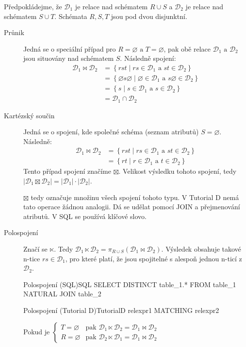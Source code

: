 Předpokládejme, že $\mathcal{D}_{1}$ je relace nad schématem $R \cup S$ a $\mathcal{D}_{2}$ je relace nad schématem $S \cup T$. Schémata $R, S, T$ jsou pod dvou disjunktní. 
\begin{description}
\item[Průnik] Jedná se o speciální případ pro $R = \varnothing \text{ a } T = \varnothing$, pak obě relace $\mathcal{D}_{1} \text{ a } \mathcal{D}_{2}$ jsou situovány nad schématem $S$. Následně spojení:
\begin{align*}
\mathcal{D}_{1} \Join \mathcal{D}_{2} &= \left\{ rst \; | \; rs \in \mathcal{D}_{1} \text{ a } st \in \mathcal{D}_{2} \right\} \\
&= \left\{ \varnothing s \varnothing \; | \; \varnothing \in \mathcal{D}_{1} \text{ a } s \varnothing \in \mathcal{D}_{2} \right\} \\
&= \left\{ s \; | \; s \in \mathcal{D}_{1} \text{ a } s \in \mathcal{D}_{2} \right\} \\
&= \mathcal{D}_{1} \cap \mathcal{D}_{2}
\end{align*}

\item[Kartézský součin] Jedná se o spojení, kde společné schéma (seznam atributů) $S = \varnothing$. Následně:
\begin{align*}
\mathcal{D}_{1} \Join \mathcal{D}_{2} &= \left\{ rst \; | \; rs \in \mathcal{D}_{1} \text{ a } st \in \mathcal{D}_{2} \right\} \\
&= \left\{ rt \; | \; r \in \mathcal{D}_{1} \text{ a } t \in \mathcal{D}_{2} \right\}
\end{align*}
Tento případ spojení značíme $\boxtimes$. Velikost výsledku tohoto spojení, tedy $\left| \mathcal{D}_{1} \boxtimes \mathcal{D}_{2} \right| = \left|\mathcal{D}_{1}\right| \cdot \left|\mathcal{D}_{2}\right|$.

$\boxtimes$ tedy označuje množinu všech spojení tohoto typu. V Tutorial D nemá tato operace žádnou analogii. Dá se udělat pomocí JOIN a přejmenování atributů. V SQL se používá klíčové slovo.

\item[Polospojení] Značí se $\ltimes$. Tedy $\mathcal{D}_{1} \ltimes \mathcal{D}_{2} = \pi_{R \cup S} (\mathcal{D}_{1} \Join \mathcal{D}_{2})$. Výsledek obsahuje takové n-tice $rs \in \mathcal{D}_{1}$, pro které platí, že jsou spojitelné s alespoň jednou n-ticí z $\mathcal{D}_{2}$.
\begin{upcode}{Polospojení (SQL)}{}{SQL}
SELECT DISTINCT table_1.* FROM table_1 NATURAL JOIN table_2
\end{upcode}
\begin{upcode}{Polospojení (Tutorial D)}{}{TutorialD}
relexpr1 MATCHING relexpr2
\end{upcode}
Pokud je $\left\{\!\!\!
\begin{array}{ll}
T = \varnothing & \text{pak } \mathcal{D}_{1} \ltimes \mathcal{D}_{2} = \mathcal{D}_{1} \Join \mathcal{D}_{2} \\
R = \varnothing & \text{pak } \mathcal{D}_{2} \ltimes \mathcal{D}_{1} = \mathcal{D}_{1} \Join \mathcal{D}_{2}
\end{array}\right.$


\end{description}
